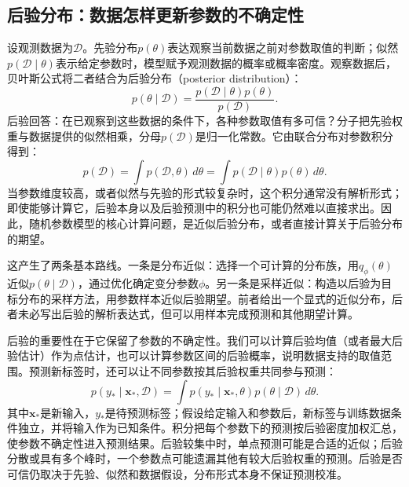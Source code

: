 \subsection{后验分布：数据怎样更新参数的不确定性}
设观测数据为$\mathcal D$。先验分布$p(\theta)$表达观察当前数据之前对参数取值的判断；似然$p(\mathcal D\mid\theta)$表示给定参数时，模型赋予观测数据的概率或概率密度。观察数据后，贝叶斯公式将二者结合为后验分布（posterior distribution）：
\begin{equation}
 p(\theta\mid\mathcal D)=\frac{p(\mathcal D\mid\theta)p(\theta)}{p(\mathcal D)}.
 \label{eq:solving-posterior}
\end{equation}
后验回答：在已观察到这些数据的条件下，各种参数取值有多可信？分子把先验权重与数据提供的似然相乘，分母$p(\mathcal D)$是归一化常数。它由联合分布对参数积分得到：
\begin{equation}
 p(\mathcal D)=\int p(\mathcal D,\theta)\,d\theta
 =\int p(\mathcal D\mid\theta)p(\theta)\,d\theta.
 \label{eq:solving-posterior-normalizer}
\end{equation}
当参数维度较高，或者似然与先验的形式较复杂时，这个积分通常没有解析形式；即使能够计算它，后验本身以及后验预测中的积分也可能仍然难以直接求出。因此，随机参数模型的核心计算问题，是近似后验分布，或者直接计算关于后验分布的期望。

这产生了两条基本路线。一条是分布近似：选择一个可计算的分布族，用$q_\phi(\theta)$近似$p(\theta\mid\mathcal D)$，通过优化确定变分参数$\phi$。另一条是采样近似：构造以后验为目标分布的采样方法，用参数样本近似后验期望。前者给出一个显式的近似分布，后者未必写出后验的解析表达式，但可以用样本完成预测和其他期望计算。

后验的重要性在于它保留了参数的不确定性。我们可以计算后验均值（或者最大后验估计）作为点估计，也可以计算参数区间的后验概率，说明数据支持的取值范围。预测新标签时，还可以让不同参数按其后验权重共同参与预测：
\begin{equation}
 p(y_*\mid\bm x_*,\mathcal D)=\int p(y_*\mid\bm x_*,\theta)p(\theta\mid\mathcal D)\,d\theta.
 \label{eq:solving-posterior-predictive}
\end{equation}
其中$\bm x_*$是新输入，$y_*$是待预测标签；假设给定输入和参数后，新标签与训练数据条件独立，并将输入作为已知条件。积分把每个参数下的预测按后验密度加权汇总，使参数不确定性进入预测结果。后验较集中时，单点预测可能是合适的近似；后验分散或具有多个峰时，一个参数点可能遗漏其他有较大后验权重的预测。后验是否可信仍取决于先验、似然和数据假设，分布形式本身不保证预测校准。

